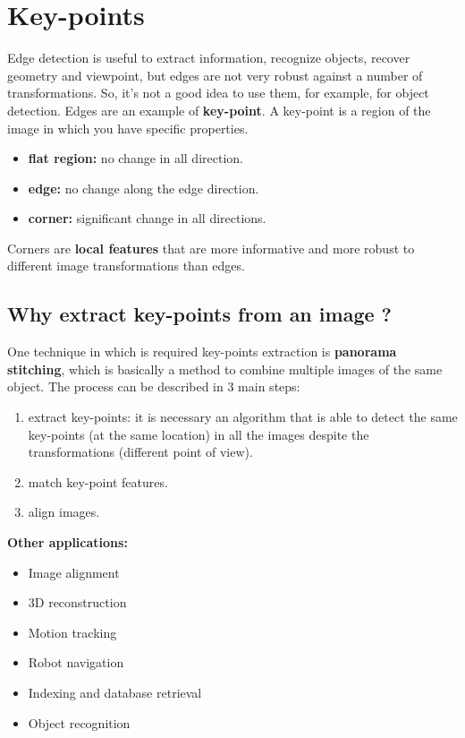 \section{Key-points}
Edge detection is useful to extract information, recognize objects, recover geometry and viewpoint, but edges are not very robust against a number of transformations. So, it's not a good idea to use them, for example, for object detection.\newline\newline
Edges are an example of \textbf{key-point}. A key-point is a region of the image in which you have specific properties.
\begin{itemize}
    \item \textbf{flat region:} no change in all direction.
    \item \textbf{edge:} no change along the edge direction.
    \item \textbf{corner:} significant change in all directions.
\end{itemize}
Corners are \textbf{local features} that are more informative and more robust to different image transformations than edges.

\subsection{Why extract key-points from an image ?}
One technique in which is required key-points extraction is \textbf{panorama stitching}, which is basically a method to combine multiple images of the same object. The process can be described in 3 main steps:
\begin{enumerate}
    \item extract key-points: it is necessary an algorithm that is able to detect the same key-points (at the same location) in all the images despite the transformations (different point of view). 
    \item match key-point features.
    \item align images.
\end{enumerate}
\textbf{Other applications:}
\begin{itemize}
    \item Image alignment
    \item 3D reconstruction
    \item Motion tracking
    \item Robot navigation
    \item Indexing and database retrieval
    \item Object recognition
\end{itemize}

